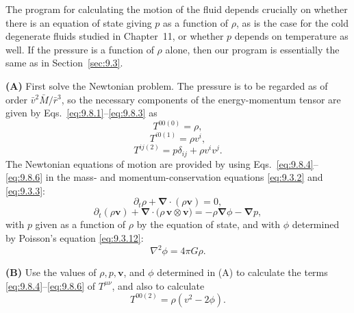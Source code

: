 The program for calculating the motion of the fluid depends crucially on
whether there is an equation of state giving \(p\) as a function of
\(\rho\), as is the case for the cold degenerate fluids studied in
Chapter~11, or whether \(p\) depends on temperature as well. If the
pressure is a function of \(\rho\) alone, then our program is essentially
the same as in Section~\ref{sec:9.3}.

\medskip
\noindent\textbf{(A)} First solve the Newtonian problem. The pressure is to
be regarded as of order \(\bar v^2\bar M/\bar r^3\), so the necessary
components of the energy-momentum tensor are given by
Eqs.~\eqref{eq:9.8.1}--\eqref{eq:9.8.3} as
\begin{equation}
  T^{00(0)}=\rho,
  \tag{9.8.4}\label{eq:9.8.4}
\end{equation}
\begin{equation}
  T^{i0(1)}=\rho v^i,
  \tag{9.8.5}\label{eq:9.8.5}
\end{equation}
\begin{equation}
  T^{ij(2)}
  =
  p\delta_{ij}+\rho v^iv^j.
  \tag{9.8.6}\label{eq:9.8.6}
\end{equation}
The Newtonian equations of motion are provided by using
Eqs.~\eqref{eq:9.8.4}--\eqref{eq:9.8.6} in the mass- and
momentum-conservation equations \eqref{eq:9.3.2} and \eqref{eq:9.3.3}:
\begin{equation}
  \partial_t\rho
  +\boldsymbol\nabla\cdot(\rho\mathbf v)
  =0,
  \tag{9.8.7}\label{eq:9.8.7}
\end{equation}
\begin{equation}
  \partial_t(\rho\mathbf v)
  +\boldsymbol\nabla\cdot
   \bigl(\rho\,\mathbf v\otimes\mathbf v\bigr)
  =
  -\rho\boldsymbol\nabla\phi-\boldsymbol\nabla p,
  \tag{9.8.8}\label{eq:9.8.8}
\end{equation}
with \(p\) given as a function of \(\rho\) by the equation of state, and
with \(\phi\) determined by Poisson's equation \eqref{eq:9.3.12}:
\begin{equation}
  \nabla^2\phi=4\pi G\rho.
  \tag{9.8.9}\label{eq:9.8.9}
\end{equation}

\medskip
\noindent\textbf{(B)} Use the values of \(\rho,p,\mathbf v\), and \(\phi\)
determined in (A) to calculate the terms
\eqref{eq:9.8.4}--\eqref{eq:9.8.6} of \(T^{\mu\nu}\), and also to
calculate
\begin{equation}
  T^{00(2)}
  =
  \rho(v^2-2\phi).
  \tag{9.8.10}\label{eq:9.8.10}
\end{equation}


